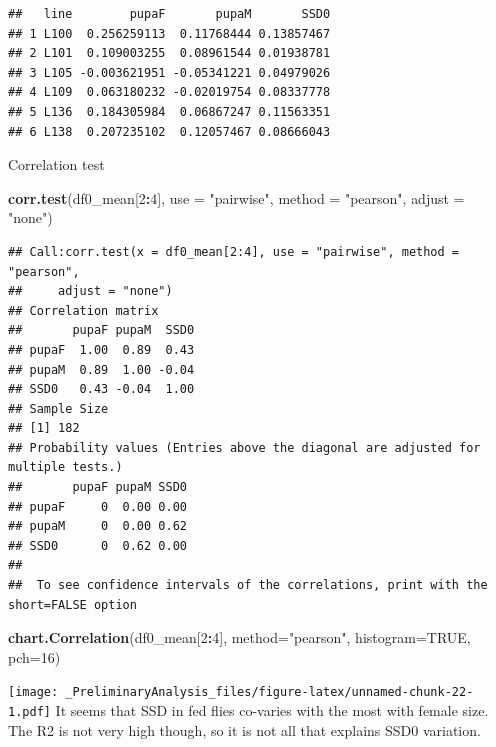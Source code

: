 \documentclass[
]{article}
\newenvironment{Shaded}{\begin{snugshade}}{\end{snugshade}}
\newcommand{\DataTypeTok}[1]{\textcolor[rgb]{0.13,0.29,0.53}{#1}}
\newcommand{\DecValTok}[1]{\textcolor[rgb]{0.00,0.00,0.81}{#1}}
\newcommand{\KeywordTok}[1]{\textcolor[rgb]{0.13,0.29,0.53}{\textbf{#1}}}
\newcommand{\NormalTok}[1]{#1}
\newcommand{\OperatorTok}[1]{\textcolor[rgb]{0.81,0.36,0.00}{\textbf{#1}}}
\newcommand{\OtherTok}[1]{\textcolor[rgb]{0.56,0.35,0.01}{#1}}
\newcommand{\StringTok}[1]{\textcolor[rgb]{0.31,0.60,0.02}{#1}}
\begin{document}
\begin{verbatim}
##   line        pupaF       pupaM       SSD0
## 1 L100  0.256259113  0.11768444 0.13857467
## 2 L101  0.109003255  0.08961544 0.01938781
## 3 L105 -0.003621951 -0.05341221 0.04979026
## 4 L109  0.063180232 -0.02019754 0.08337778
## 5 L136  0.184305984  0.06867247 0.11563351
## 6 L138  0.207235102  0.12057467 0.08666043
\end{verbatim}

Correlation test

\begin{Shaded}
\begin{Highlighting}[]
\KeywordTok{corr.test}\NormalTok{(df0_mean[}\DecValTok{2}\OperatorTok{:}\DecValTok{4}\NormalTok{],}
          \DataTypeTok{use    =} \StringTok{"pairwise"}\NormalTok{,}
          \DataTypeTok{method =} \StringTok{"pearson"}\NormalTok{,}
          \DataTypeTok{adjust =} \StringTok{"none"}\NormalTok{)}
\end{Highlighting}
\end{Shaded}

\begin{verbatim}
## Call:corr.test(x = df0_mean[2:4], use = "pairwise", method = "pearson", 
##     adjust = "none")
## Correlation matrix 
##       pupaF pupaM  SSD0
## pupaF  1.00  0.89  0.43
## pupaM  0.89  1.00 -0.04
## SSD0   0.43 -0.04  1.00
## Sample Size 
## [1] 182
## Probability values (Entries above the diagonal are adjusted for multiple tests.) 
##       pupaF pupaM SSD0
## pupaF     0  0.00 0.00
## pupaM     0  0.00 0.62
## SSD0      0  0.62 0.00
## 
##  To see confidence intervals of the correlations, print with the short=FALSE option
\end{verbatim}

\begin{Shaded}
\begin{Highlighting}[]
\KeywordTok{chart.Correlation}\NormalTok{(df0_mean[}\DecValTok{2}\OperatorTok{:}\DecValTok{4}\NormalTok{],}
                   \DataTypeTok{method=}\StringTok{"pearson"}\NormalTok{,}
                   \DataTypeTok{histogram=}\OtherTok{TRUE}\NormalTok{,}
                   \DataTypeTok{pch=}\DecValTok{16}\NormalTok{)}
\end{Highlighting}
\end{Shaded}

\texttt{[image: \_PreliminaryAnalysis\_files/figure-latex/unnamed-chunk-22-1.pdf]}
It seems that SSD in fed flies co-varies with the most with female size.
The R2 is not very high though, so it is not all that explains SSD0
variation.
\end{document}

